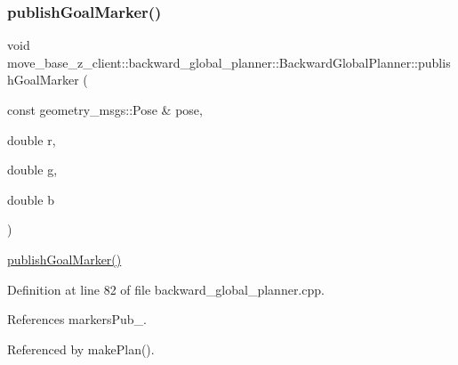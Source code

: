 \subsubsection{\texorpdfstring{publish\+Goal\+Marker()}{publishGoalMarker()}}
{\footnotesize\ttfamily void move\+\_\+base\+\_\+z\+\_\+client\+::backward\+\_\+global\+\_\+planner\+::\+Backward\+Global\+Planner\+::publish\+Goal\+Marker (\begin{DoxyParamCaption}\item[{const geometry\+\_\+msgs\+::\+Pose \&}]{pose,  }\item[{double}]{r,  }\item[{double}]{g,  }\item[{double}]{b }\end{DoxyParamCaption})\hspace{0.3cm}{\ttfamily [private]}}

\hyperlink{classmove__base__z__client_1_1backward__global__planner_1_1BackwardGlobalPlanner_adefb1127aa2a4f9c487763aea3817864}{publish\+Goal\+Marker()} 

Definition at line 82 of file backward\+\_\+global\+\_\+planner.\+cpp.



References markers\+Pub\+\_\+.



Referenced by make\+Plan().


